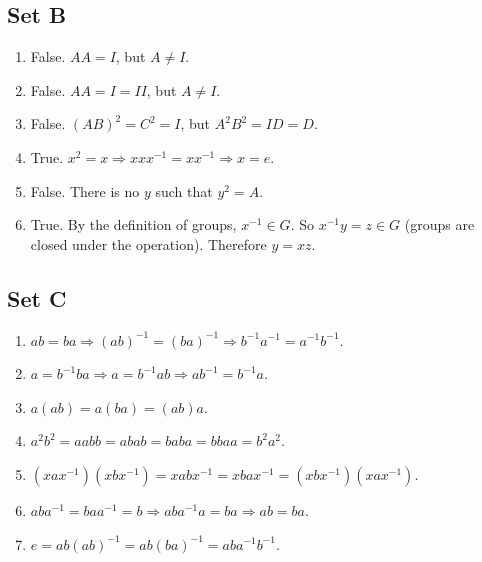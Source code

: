 \documentclass{article}
\begin{document}
\subsection*{Set B}
\begin{enumerate}
    \item False. $AA = I$, but $A \ne I$.
    \item False. $AA = I = II$, but $A \ne I$.
    \item False. $(AB)^2 = C^2 = I$, but $A^2B^2 = ID = D$.
    \item True. $x^2 = x \Rightarrow xxx^{-1} = xx^{-1} \Rightarrow x = e$.
    \item False. There is no $y$ such that $y^2 = A$.
    \item True. By the definition of groups, $x^{-1} \in G$. So $x^{-1}y = z \in G$ (groups are closed under the operation). Therefore $y = xz$. 
\end{enumerate}

\subsection*{Set C}
\begin{enumerate}
    \item $ab = ba \Rightarrow (ab)^{-1} = (ba)^{-1} \Rightarrow b^{-1}a^{-1} = a^{-1}b^{-1}$.
    \item $a = b^{-1}ba \Rightarrow a = b^{-1}ab \Rightarrow ab^{-1} = b^{-1}a$.
    \item $a(ab) = a(ba) = (ab)a$.
    \item $a^2b^2 = aabb = abab = baba = bbaa = b^2a^2$.
    \item $(xax^{-1})(xbx^{-1}) = xabx^{-1} = xbax^{-1} = (xbx^{-1})(xax^{-1})$.
    \item $aba^{-1} = baa^{-1} = b \Rightarrow aba^{-1}a = ba \Rightarrow ab = ba$.
    \item $e = ab(ab)^{-1} = ab(ba)^{-1} = aba^{-1}b^{-1}$.
\end{enumerate}
\end{document}
